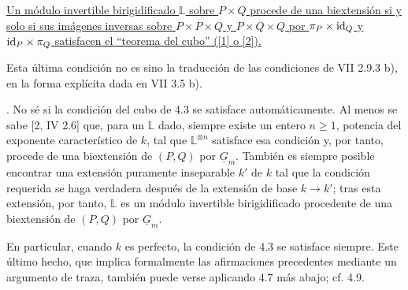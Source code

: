 \underline{Un módulo invertible birigidificado $\mathbb L$ sobre
$P\times Q$ procede de una biextensión si y solo si sus imágenes
inversas sobre $P\times P\times Q$ y $P\times Q\times Q$ por
$\pi_P\times\mathrm{id}_Q$ y $\mathrm{id}_P\times\pi_Q$ satisfacen el ``teorema del
cubo'' ([1] o [2]).}

Esta última condición no es sino la traducción de las condiciones de
VII 2.9.3 b), en la forma explícita dada en VII 3.5 b).

\medskip
{}. No sé si la condición del cubo de 4.3 se satisface
automáticamente. Al menos se sabe [2, IV 2.6] que, para un
$\mathbb L$ dado, siempre existe un entero $n\geq1$, potencia del
exponente característico de $k$, tal que $\mathbb L^{\otimes n}$
satisface esa condición y, por tanto, procede de una biextensión de
$(P,Q)$ por $\underline G_m$. También es siempre posible encontrar
una extensión puramente inseparable $k'$ de $k$ tal que la condición
requerida se haga verdadera después de la extensión de base
$k\longrightarrow k'$; tras esta extensión, por tanto, $\mathbb L$ es
un módulo invertible birigidificado procedente de una biextensión de
$(P,Q)$ por $\underline G_m$.

En particular, cuando $k$ es perfecto, la condición de 4.3 se
satisface siempre. Este último hecho, que implica formalmente las
afirmaciones precedentes mediante un argumento de traza, también puede
verse aplicando 4.7 más abajo; cf. 4.9.
